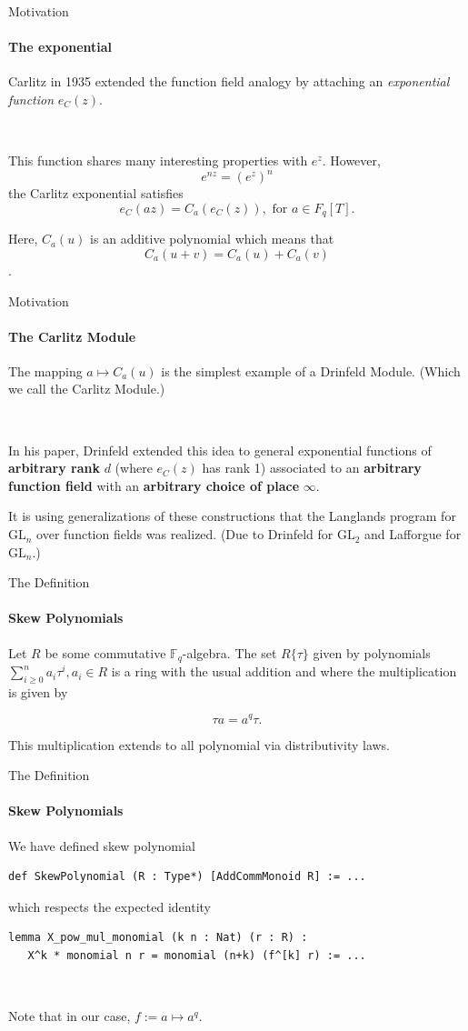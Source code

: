 \begin{frame}{Motivation}
	\framesubtitle{The exponential}
	
	Carlitz in 1935 extended the function field analogy by attaching an \textit{exponential function} $e_C(z)$.

	\

	This function shares many interesting properties with $e^z$.
	However, 
	$$e^{nz} = (e^z)^n$$
	the Carlitz exponential satisfies
	$$e_C(az) = C_a(e_C(z)), \text{ for } a \in F_q[T].$$

	\pause

	Here, $C_a(u)$ is an additive polynomial which means that
	$$C_a(u + v) = C_a(u) + C_a(v)$$.
\end{frame}

\begin{frame}{Motivation}
	\framesubtitle{The Carlitz Module}
	
	The mapping $a \mapsto C_a(u)$ is the simplest example of a Drinfeld Module. (Which we call the Carlitz Module.)

	\pause
	\

	In his paper, Drinfeld extended this idea to general exponential functions of \textbf{arbitrary rank} $d$ (where $e_C(z)$ has rank 1) associated to an \textbf{arbitrary function field} with an \textbf{arbitrary choice of place} $\infty$.

	It is using generalizations of these constructions that the Langlands program for $\text{GL}_n$ over function fields was realized. (Due to Drinfeld for $\text{GL}_2$ and Lafforgue for $\text{GL}_n$.)

\end{frame}

\begin{frame}{The Definition}
	\framesubtitle{Skew Polynomials}
	
	Let $R$ be some commutative $\mathbb{F}_q$-algebra. The set $R\{\tau\}$ given by polynomials $\sum_{i\geq 0}^n a_i \tau^i, a_i \in R$ is a ring with the usual addition and where the multiplication is given by
	
	$$\tau  a = a^{q}\tau.$$

	This multiplication extends to all polynomial via distributivity laws.

\end{frame}

\begin{frame}[fragile]{The Definition}
	\framesubtitle{Skew Polynomials}
	
	We have defined skew polynomial
        \begin{verbatim}
def SkewPolynomial (R : Type*) [AddCommMonoid R] := ...
        \end{verbatim}
	which respects the expected identity
	\begin{verbatim}
lemma X_pow_mul_monomial (k n : Nat) (r : R) :
   X^k * monomial n r = monomial (n+k) (f^[k] r) := ...
	\end{verbatim}
    
        \ 
        
        Note that in our case, $f := a \mapsto a^q$.
\end{frame}

